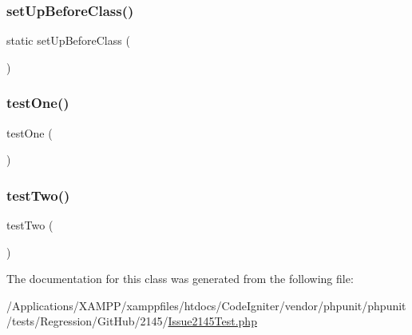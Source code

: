 \subsubsection{\texorpdfstring{set\+Up\+Before\+Class()}{setUpBeforeClass()}}
{\footnotesize\ttfamily static set\+Up\+Before\+Class (\begin{DoxyParamCaption}{ }\end{DoxyParamCaption})\hspace{0.3cm}{\ttfamily [static]}}

\mbox{\label{class_issue2145_test_afbf3ff88b322c6a7197ce02297cd23a0}} 
\subsubsection{\texorpdfstring{test\+One()}{testOne()}}
{\footnotesize\ttfamily test\+One (\begin{DoxyParamCaption}{ }\end{DoxyParamCaption})}

\mbox{\label{class_issue2145_test_a4fb9974ce113d5d1db8075e0db0dc9b6}} 
\subsubsection{\texorpdfstring{test\+Two()}{testTwo()}}
{\footnotesize\ttfamily test\+Two (\begin{DoxyParamCaption}{ }\end{DoxyParamCaption})}



The documentation for this class was generated from the following file\+:\begin{DoxyCompactItemize}
\item 
/\+Applications/\+X\+A\+M\+P\+P/xamppfiles/htdocs/\+Code\+Igniter/vendor/phpunit/phpunit/tests/\+Regression/\+Git\+Hub/2145/\mbox{\hyperlink{_issue2145_test_8php}{Issue2145\+Test.\+php}}\end{DoxyCompactItemize}
